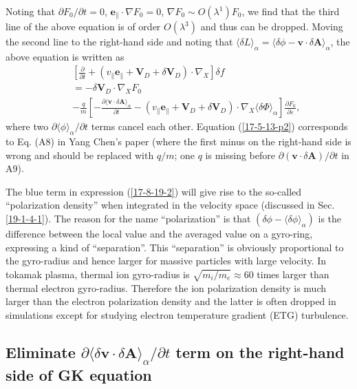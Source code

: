 \documentclass{article}
\begin{document}
Noting that $\partial F_0 / \partial t = 0$, $\mathbf{e}_{\parallel} \cdot
\nabla F_0 = 0$, $\nabla F_0 \sim O (\lambda^1) F_0$, we find that the third
line of the above equation is of order $O (\lambda^3)$ and thus can be
dropped. Moving the second line to the right-hand side and noting that
$\langle \delta L \rangle_{\alpha} = \langle \delta \phi -\mathbf{v} \cdot
\delta \mathbf{A} \rangle_{\alpha}$, the above equation is written as
\begin{eqnarray}
  &  & \left[ \frac{\partial}{\partial t} + (v_{\parallel}
  \mathbf{e}_{\parallel} +\mathbf{V}_D + \delta \mathbf{V}_D) \cdot \nabla_X
  \right] \delta f \nonumber\\
  &  & = - \delta \mathbf{V}_D \cdot \nabla_X F_0 \nonumber\\
  &  & - \frac{q}{m} \left[ - \frac{\partial \langle \mathbf{v} \cdot \delta
  \mathbf{A} \rangle_{\alpha}}{\partial t} - (v_{\parallel}
  \mathbf{e}_{\parallel} +\mathbf{V}_D + \delta \mathbf{V}_D) \cdot \nabla_X
  \langle \delta \Phi \rangle_{\alpha} \right] \frac{\partial F_0}{\partial
  \varepsilon},  \label{17-5-13-p2}
\end{eqnarray}
where two $\partial \langle \phi \rangle_{\alpha} / \partial t$ terms cancel
each other. Equation (\ref{17-5-13-p2}) corresponds to Eq. (A8) in Yang Chen's
paper{\cite{ychen2009}} (where the first minus on the right-hand side is wrong
and should be replaced with $q / m$; one $q$ is missing before $\partial
(\mathbf{v} \cdot \delta \mathbf{A}) / \partial t$ in A9).

The blue term in expression (\ref{17-8-19-2}) will give rise to the so-called
``polarization density'' when integrated in the velocity space (discussed in
Sec. \ref{19-1-4-1}). The reason for the name ``polarization'' is that
$(\delta \phi - \langle \delta \phi \rangle_{\alpha})$ is the difference
between the local value and the averaged value on a gyro-ring, expressing a
kind of ``separation''. This ``separation'' is obviously proportional to the
gyro-radius and hence larger for massive particles with large velocity. In
tokamak plasma, thermal ion gyro-radius is $\sqrt{m_i / m_e} \approx 60$ times
larger than thermal electron gyro-radius. Therefore the ion polarization
density is much larger than the electron polarization density and the latter
is often dropped in simulations except for studying electron temperature
gradient (ETG) turbulence.

\subsection{Eliminate $\partial \langle \delta \mathbf{v} \cdot \delta
\mathbf{A} \rangle_{\alpha} / \partial t$ term on the right-hand side of GK
equation}
\end{document}
